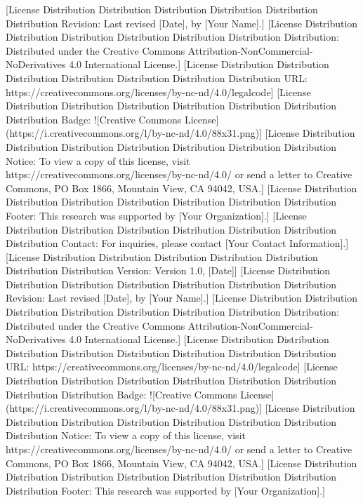 [License Distribution Distribution Distribution Distribution Distribution Distribution Revision: Last revised [Date], by [Your Name].]  
[License Distribution Distribution Distribution Distribution Distribution Distribution Distribution: Distributed under the Creative Commons Attribution-NonCommercial-NoDerivatives 4.0 International License.]  
[License Distribution Distribution Distribution Distribution Distribution Distribution Distribution URL: https://creativecommons.org/licenses/by-nc-nd/4.0/legalcode]  
[License Distribution Distribution Distribution Distribution Distribution Distribution Distribution Badge: ![Creative Commons License](https://i.creativecommons.org/l/by-nc-nd/4.0/88x31.png)]  
[License Distribution Distribution Distribution Distribution Distribution Distribution Distribution Notice: To view a copy of this license, visit https://creativecommons.org/licenses/by-nc-nd/4.0/ or send a letter to Creative Commons, PO Box 1866, Mountain View, CA 94042, USA.]  
[License Distribution Distribution Distribution Distribution Distribution Distribution Distribution Footer: This research was supported by [Your Organization].]  
[License Distribution Distribution Distribution Distribution Distribution Distribution Distribution Contact: For inquiries, please contact [Your Contact Information].]  
[License Distribution Distribution Distribution Distribution Distribution Distribution Distribution Version: Version 1.0, [Date]]  
[License Distribution Distribution Distribution Distribution Distribution Distribution Distribution Revision: Last revised [Date], by [Your Name].]  
[License Distribution Distribution Distribution Distribution Distribution Distribution Distribution Distribution: Distributed under the Creative Commons Attribution-NonCommercial-NoDerivatives 4.0 International License.]  
[License Distribution Distribution Distribution Distribution Distribution Distribution Distribution Distribution URL: https://creativecommons.org/licenses/by-nc-nd/4.0/legalcode]  
[License Distribution Distribution Distribution Distribution Distribution Distribution Distribution Distribution Badge: ![Creative Commons License](https://i.creativecommons.org/l/by-nc-nd/4.0/88x31.png)]  
[License Distribution Distribution Distribution Distribution Distribution Distribution Distribution Distribution Notice: To view a copy of this license, visit https://creativecommons.org/licenses/by-nc-nd/4.0/ or send a letter to Creative Commons, PO Box 1866, Mountain View, CA 94042, USA.]  
[License Distribution Distribution Distribution Distribution Distribution Distribution Distribution Distribution Footer: This research was supported by [Your Organization].]  
